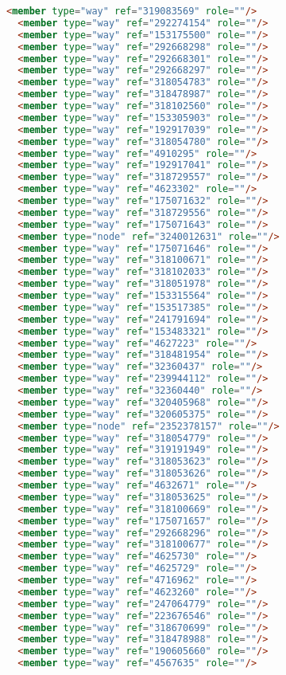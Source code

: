 \begin{lstlisting}[language=HTML,basicstyle=\tiny,caption=test.xml]
  <member type="way" ref="319083569" role=""/>
  <member type="way" ref="292274154" role=""/>
  <member type="way" ref="153175500" role=""/>
  <member type="way" ref="292668298" role=""/>
  <member type="way" ref="292668301" role=""/>
  <member type="way" ref="292668297" role=""/>
  <member type="way" ref="318054783" role=""/>
  <member type="way" ref="318478987" role=""/>
  <member type="way" ref="318102560" role=""/>
  <member type="way" ref="153305903" role=""/>
  <member type="way" ref="192917039" role=""/>
  <member type="way" ref="318054780" role=""/>
  <member type="way" ref="4910295" role=""/>
  <member type="way" ref="192917041" role=""/>
  <member type="way" ref="318729557" role=""/>
  <member type="way" ref="4623302" role=""/>
  <member type="way" ref="175071632" role=""/>
  <member type="way" ref="318729556" role=""/>
  <member type="way" ref="175071643" role=""/>
  <member type="node" ref="3240012631" role=""/>
  <member type="way" ref="175071646" role=""/>
  <member type="way" ref="318100671" role=""/>
  <member type="way" ref="318102033" role=""/>
  <member type="way" ref="318051978" role=""/>
  <member type="way" ref="153315564" role=""/>
  <member type="way" ref="153517385" role=""/>
  <member type="way" ref="241791694" role=""/>
  <member type="way" ref="153483321" role=""/>
  <member type="way" ref="4627223" role=""/>
  <member type="way" ref="318481954" role=""/>
  <member type="way" ref="32360437" role=""/>
  <member type="way" ref="239944112" role=""/>
  <member type="way" ref="32360440" role=""/>
  <member type="way" ref="320405968" role=""/>
  <member type="way" ref="320605375" role=""/>
  <member type="node" ref="2352378157" role=""/>
  <member type="way" ref="318054779" role=""/>
  <member type="way" ref="319191949" role=""/>
  <member type="way" ref="318053623" role=""/>
  <member type="way" ref="318053626" role=""/>
  <member type="way" ref="4632671" role=""/>
  <member type="way" ref="318053625" role=""/>
  <member type="way" ref="318100669" role=""/>
  <member type="way" ref="175071657" role=""/>
  <member type="way" ref="292668296" role=""/>
  <member type="way" ref="318100677" role=""/>
  <member type="way" ref="4625730" role=""/>
  <member type="way" ref="4625729" role=""/>
  <member type="way" ref="4716962" role=""/>
  <member type="way" ref="4623260" role=""/>
  <member type="way" ref="247064779" role=""/>
  <member type="way" ref="223676546" role=""/>
  <member type="way" ref="318670699" role=""/>
  <member type="way" ref="318478988" role=""/>
  <member type="way" ref="190605660" role=""/>
  <member type="way" ref="4567635" role=""/>

\end{lstlisting}
